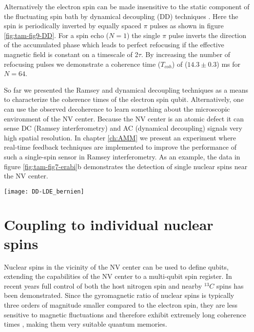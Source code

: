 Alternatively the electron spin can be made insensitive to the static component of the fluctuating spin bath by dynamical decoupling (DD) techniques \cite{Lange_Science_2010,Ryan_Phys.Rev.Lett._2010}. Here the spin is periodically inverted by equally spaced $\pi$ pulses as shown in figure \ref{fig:tam-fig9-DD}. For a spin echo ($N = 1$) the single $\pi$ pulse inverts the direction of the accumulated phase which leads to perfect refocusing if the effective magnetic field is constant on a timescale of 2$\tau$. By increasing the number of refocusing pulses we demonstrate a coherence time ($T_{coh}$) of ($14.3 \pm 0.3$) ms for $N = 64$.

So far we presented the Ramsey and dynamical decoupling techniques as a means to characterize the coherence times of the electron spin qubit. Alternatively, one can use the observed decoherence to learn something about the microscopic environment of the NV center. Because the NV center is an atomic defect it can sense DC (Ramsey interferometry) and AC (dynamical decoupling) signals very high spatial resolution. In chapter \ref{ch:AMM} we present an experiment where real-time feedback techniques are implemented to improve the performance of such a single-spin sensor in Ramsey interferometry. As an example, the data in figure \ref{fig:tam-fig7-erabi}b demonstrates the detection of single nuclear spins near the NV center.

\begin{figure*}
	\centering
	\texttt{[image: DD-LDE\_bernien]}
	\caption{\label{fig:tam-fig9-DD} \textbf{Dynamical Decoupling of the electron spin} (a) }
\end{figure*}

\section{Coupling to individual nuclear spins}
Nuclear spins in the vicinity of the NV center can be used to define qubits, extending the capabilities of the NV center to a multi-qubit spin register. In recent years full control of both the host nitrogen spin \cite{Gaebel_NatPhys_2006,Hanson_Phys.Rev.Lett._2006,Neumann_Science_2010,Fuchs_NatPhys_2011,vanderSar_Nature_2012} and nearby $^{13}C$ spins \cite{Jelezko_Phys.Rev.Lett._2004,Dutt_Science_2007,Neumann_Science_2008,Jiang_Science_2009,Smeltzer_Phys.Rev.A_2009,Taminiau_Phys.Rev.Lett._2012} has been demonstrated. Since the gyromagnetic ratio of nuclear spins is typically three orders of magnitude smaller compared to the electron spin, they are less sensitive to magnetic fluctuations and therefore exhibit extremely long coherence times \cite{Maurer_Science_2012}, making them very suitable quantum memories.

